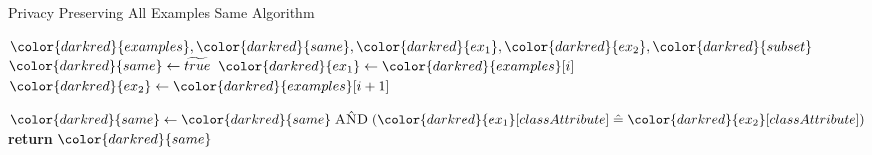\begin{algorithm}[H]
\caption{Privacy Preserving All Examples Same Algorithm}\label{a:id3-same-pp}
\begin{algorithmic}[1]
\renewcommand{\algorithmicrequire}{\textbf{Private Vars:}}
\Require ${\color{darkred}{examples}}, {\color{darkred}{same}}, {\color{darkred}{ex_1}}, {\color{darkred}{ex_2}}, {\color{darkred}{subset}}$
    \State ${\color{darkred}{same}} \gets \enc{true}$
        \State ${\color{darkred}{ex_1}} \gets {\color{darkred}{examples}}[i]$
        \State ${\color{darkred}{ex_2}} \gets {\color{darkred}{examples}}[i+1]$

        \State ${\color{darkred}{same}} \gets {\color{darkred}{same}} \hand ({\color{darkred}{ex_1}}[classAttribute] \heq {\color{darkred}{ex_2}}[classAttribute])$
    \EndFor
    \State \textbf{return} ${\color{darkred}{same}}$
\EndProcedure
\end{algorithmic}
\end{algorithm}
